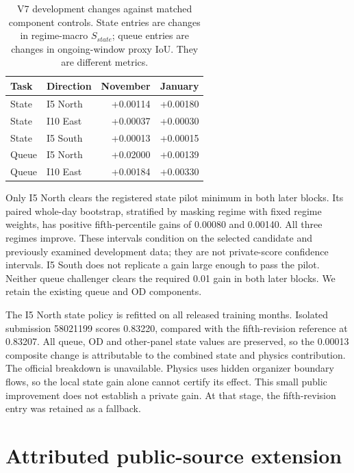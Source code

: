 \documentclass[conference]{IEEEtran}
\begin{document}
\begin{table}[t]
\centering\caption{V7 development changes against matched component controls.
State entries are changes in regime-macro $S_{state}$; queue entries are changes
in ongoing-window proxy IoU. They are different metrics.}
\label{tab:v7}
\begin{tabular}{llrr}
\hline
Task & Direction & November & January \\
\hline
State & I5 North & +0.00114 & +0.00180 \\
State & I10 East & +0.00037 & +0.00030 \\
State & I5 South & +0.00013 & +0.00015 \\
Queue & I5 North & +0.02000 & +0.00139 \\
Queue & I10 East & +0.00184 & +0.00330 \\
\hline
\end{tabular}
\end{table}

Only I5 North clears the registered state pilot minimum in both later blocks.
Its paired whole-day bootstrap, stratified by masking regime with fixed regime
weights, has positive fifth-percentile gains of 0.00080 and 0.00140.
All three regimes improve. These intervals condition on the selected candidate
and previously examined development data; they are not private-score confidence
intervals. I5 South does not replicate a gain large enough to pass the pilot.
Neither queue challenger clears the required 0.01 gain in both later blocks.
We retain the existing queue and OD components.

The I5 North state policy is refitted on all released training months.
Isolated submission 58021199 scores 0.83220, compared with the fifth-revision
reference at 0.83207. All queue, OD and other-panel state values are preserved,
so the 0.00013 composite change is attributable to the combined state and
physics contribution. The official breakdown is unavailable. Physics uses
hidden organizer boundary flows, so the local state gain alone cannot certify
its effect. This small public improvement does not establish a private gain.
At that stage, the fifth-revision entry was retained as a fallback.

\section{Attributed public-source extension}
\end{document}
